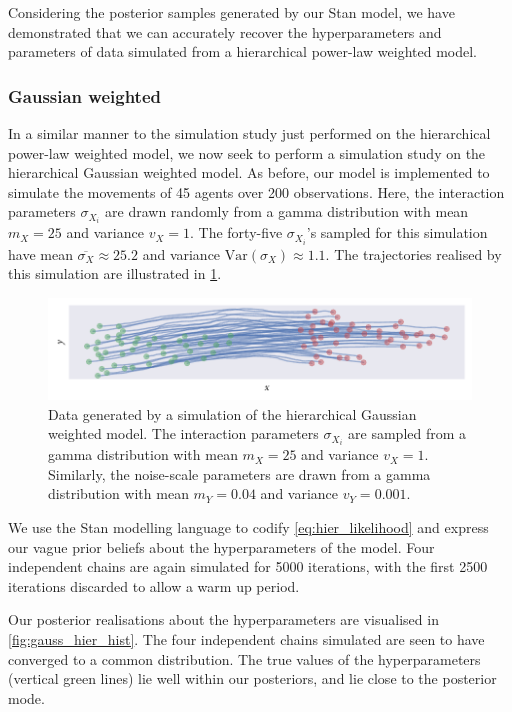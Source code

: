 Considering the posterior samples generated by our Stan model, we have
demonstrated that we can accurately recover the hyperparameters and parameters
of data simulated from a hierarchical power-law weighted model.

\subsubsection{Gaussian weighted}

In a similar manner to the simulation study just performed on the hierarchical
power-law weighted model, we now seek to perform a simulation study on the
hierarchical Gaussian weighted model. As before, our model is implemented to
simulate the movements of 45 agents over 200 observations. Here, the
interaction parameters $\sigma_{X_i}$ are drawn randomly from a gamma
distribution with mean $m_X=25$ and variance $v_X=1$. The forty-five
$\sigma_{X_i}$'s sampled for this simulation have mean
$\overline{\sigma_X}\approx25.2$ and variance $\text{Var}(\sigma_X)\approx1.1$.
The trajectories realised by this simulation are illustrated in
\cref{fig:gauss_hier_sim}.

\begin{figure}[tbp]
  \includegraphics{gauss/gauss_hier_sim.pdf}
  \caption{Data generated by a simulation of the hierarchical Gaussian weighted
    model. The interaction parameters $\sigma_{X_i}$ are sampled from a gamma
    distribution with mean $m_X=25$ and variance $v_X=1$. Similarly, the
    noise-scale parameters are drawn from a gamma distribution with mean
    $m_Y=0.04$ and variance $v_Y=0.001$.} 
  \label{fig:gauss_hier_sim}
\end{figure}

We use the Stan modelling language to codify \cref{eq:hier_likelihood} and
express our vague prior beliefs about the hyperparameters of the model. Four
independent chains are again simulated for 5000 iterations, with the first
2500 iterations discarded to allow a warm up period.

Our posterior realisations about the hyperparameters are visualised in
\cref{fig:gauss_hier_hist}. The four independent chains simulated are seen to
have converged to a common distribution. The true values of the hyperparameters
(vertical green lines) lie well within our posteriors, and lie close to
the posterior mode.

